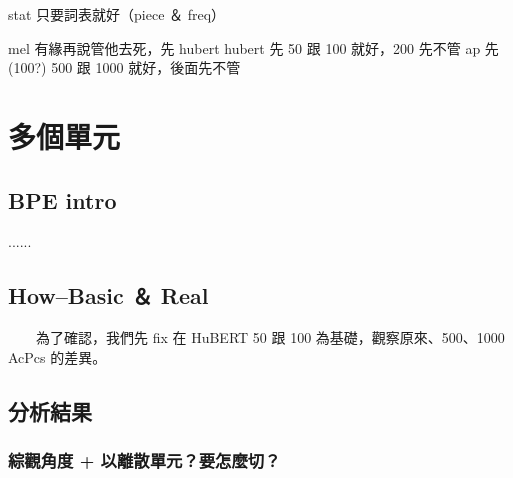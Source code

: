 
stat 只要詞表就好（piece ＆ freq）

mel 有緣再說管他去死，先 hubert
hubert 先 50 跟 100 就好，200 先不管
ap  先 (100?) 500 跟 1000 就好，後面先不管

\chapter{多個單元} \cite{-}

\section{BPE intro} 
        ......

\section{How--Basic ＆ Real}
　　為了確認，我們先 fix 在 HuBERT 50 跟 100 為基礎，觀察原來、500、1000 AcPcs 的差異。

\section{分析結果}

\subsection{綜觀角度 + 以離散單元？要怎麼切？}

